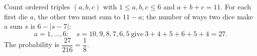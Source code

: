 Count ordered triples $(a,b,c)$ with $1\le a,b,c\le6$ and $a+b+c=11$. For each first die $a$, the other two must sum to $11-a$; the number of ways two dice make a sum $s$ is $6-|s-7|$:
\[a=1,\dots,6:\quad s=10,9,8,7,6,5\ \text{give}\ 3+4+5+6+5+4=27.\]
The probability is $\dfrac{27}{216}=\boxed{\dfrac{1}{8}}$.
